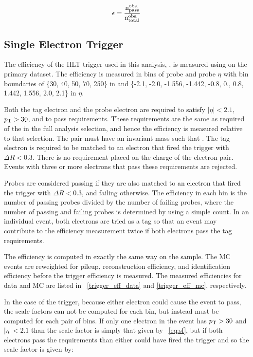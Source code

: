 \begin{equation}
    \label{eq:eff}
    \epsilon = \frac{
        \text{n}^{\text{obs.}}_{\text{pass}}
    }{
        \text{n}^{\text{obs.}}_{\text{total}}
    }
\end{equation}

\subsection{Single Electron Trigger}
\label{ssec:sf_trigger}

The efficiency of the HLT trigger used in this analysis,
\SingleElectronTrigger, is measured using \TnP on the primary dataset. The
efficiency is measured in bins of probe \pt and probe $\eta$ with bin
boundaries of \{30, 40, 50, 70, 250\} in \pt and \{-2.1, -2.0, -1.556, -1.442,
-0.8, 0., 0.8, 1.442, 1.556, 2.0, 2.1\} in $\eta$.

Both the tag electron and the probe electron are required to satisfy $|\eta| <
2.1$, $p_{\mathrm{T}} > 30$, and to pass \EGTIGHT requirements. These requirements are the
same as required of the \CentralElectron in the full analysis selection, and
hence the efficiency is measured relative to that selection. The pair must have
an invariant mass such that \MassRange. The tag electron is required to be
matched to an electron that fired the trigger with $\Delta R < 0.3$. There is
no requirement placed on the charge of the electron pair. Events with three or
more electrons that pass these requirements are rejected.

Probes are considered passing if they are also matched to an electron that
fired the trigger with $\Delta R < 0.3$, and failing otherwise. The efficiency
in each bin is the number of passing probes divided by the number of failing
probes, where the number of passing and failing probes is determined by using a
simple count. In an individual event, both electrons are tried as a tag so that
an event may contribute to the efficiency measurement twice if both electrons
pass the tag requirements.

The efficiency is computed in exactly the same way on the \MADGRAPH sample. The
MC events are reweighted for pileup, reconstruction efficiency, and
identification efficiency before the trigger efficiency is measured. The
measured efficiencies for data and MC are listed in
\TABS~\ref{trigger_eff_data} and \ref{trigger_eff_mc}, respectively.

In the case of the trigger, because either electron could cause the event to
pass, the scale factors can not be computed for each bin, but instead must be computed
for each pair of bins. If only one electron in the event has $p_{\mathrm{T}} > 30$ and
$|\eta| < 2.1$ than the scale factor is simply that given by \EQ~\ref{eq:sf}, but if both
electrons pass the requirements than either could have fired the trigger and so
the scale factor is given by:

